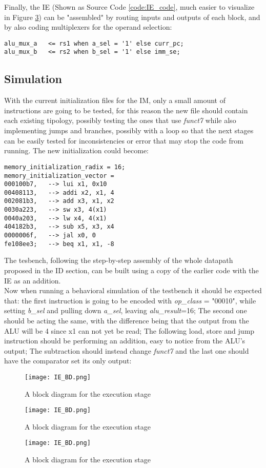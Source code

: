 Finally, the IE (Shown as Source Code \ref{code:IE_code}, much easier to visualize in Figure \ref{fig:IE_BD}) can be "assembled" by routing inputs and outputs of each block, and by also coding multiplexers for the operand selection:

\begin{verbatim}
alu_mux_a   <= rs1 when a_sel = '1' else curr_pc;
alu_mux_b   <= rs2 when b_sel = '1' else imm_se;
\end{verbatim}

\subsection{Simulation}
With the current initialization files for the IM, only a small amount of instructions are going to be tested, for this reason the new file should contain each existing tipology, possibly testing the ones that use \emph{funct7} while also implementing jumps and branches, possibly with a loop so that the next stages can be easily tested for inconsistencies or error that may stop the code from running.
The new initialization could become:

\begin{verbatim}
memory_initialization_radix = 16;
memory_initialization_vector =
000100b7,   --> lui x1, 0x10
00408113,   --> addi x2, x1, 4
002081b3,   --> add x3, x1, x2
0030a223,   --> sw x3, 4(x1)
0040a203,   --> lw x4, 4(x1)
404182b3,   --> sub x5, x3, x4
0000006f,   --> jal x0, 0 
fe108ee3;   --> beq x1, x1, -8
\end{verbatim}

The tesbench, following the step-by-step assembly of the whole datapath proposed in the ID section, can be built using a copy of the earlier code with the IE as an addition.\\
Now when running a behavioral simulation of the testbench it should be expected that: the first instruction is going to be encoded with \emph{op{\_}class} = "00010", while setting \emph{b{\_}sel} and pulling down \emph{a{\_}sel}, leaving \emph{alu{\_}result}=16; The second one should be acting the same, with the difference being that the output from the ALU will be 4 since x1 can not yet be read; The following load, store and jump instruction should be performing an addition, easy to notice from the ALU's output; The subtraction should instead change \emph{funct7} and the last one should have the comparator set its only output:

\begin{figure}[ht]
    \centering
    \texttt{[image: IE\_BD.png]}
    \caption{A block diagram for the execution stage}
    \label{fig:IE_BD}
\end{figure}
\begin{figure}[ht]
    \centering
    \texttt{[image: IE\_BD.png]}
    \caption{A block diagram for the execution stage}
    \label{fig:IE_BD}
\end{figure}
\begin{figure}[ht]
    \centering
    \texttt{[image: IE\_BD.png]}
    \caption{A block diagram for the execution stage}
    \label{fig:IE_BD}
\end{figure}


